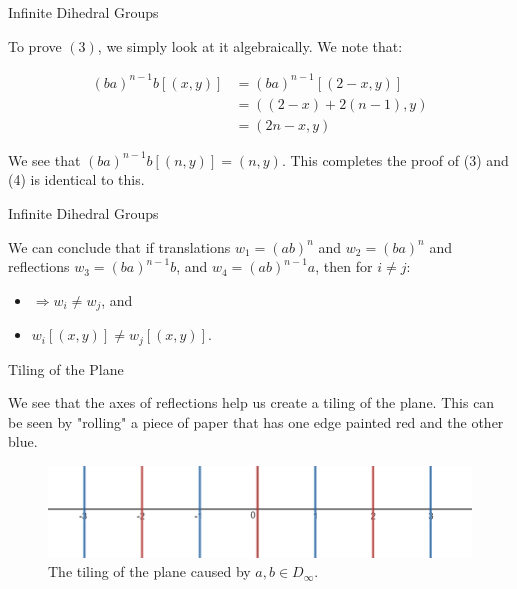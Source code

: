 \documentclass[usenames,dvipsnames]{beamer}
\begin{document}
\begin{frame}{Infinite Dihedral Groups}

To prove $(3)$, we simply look at it algebraically. We note that:

\begin{align*}
(ba)^{n-1}b[(x,y)]
&= (ba)^{n-1}[(2-x,y)] \\
&= ((2-x)+2(n-1),y) \\
&= (2n-x,y)
\end{align*}

We see that $(ba)^{n-1}b[(n,y)]=(n,y)$. This completes the proof of (3) and (4) is identical to this.
\end{frame}

\begin{frame}{Infinite Dihedral Groups}

We can conclude that if translations $w_{1}=(ab)^{n}$ and $w_{2}=(ba)^{n}$ and reflections
$w_{3}=(ba)^{n-1}b$, and $w_{4}=(ab)^{n-1}a$, then for $i\neq j$:

\begin{itemize}
  \item $\Rightarrow w_{i}\neq w_{j}$, and
  \item $w_{i}[(x,y)]\neq w_{j}[(x,y)]$.
\end{itemize}

\end{frame}

\begin{frame}{Tiling of the Plane}

We see that the axes of reflections help us create a tiling of the plane. This can be seen by "rolling" a
piece of paper that has one edge painted red and the other blue.

\begin{figure}[h]
    \centering
    \includegraphics[width=1\textwidth]{images/2-02-Tiling.png}
    \caption{The tiling of the plane caused by $a,b\in D_\infty$.}
\end{figure}

\end{frame}
\end{document}
